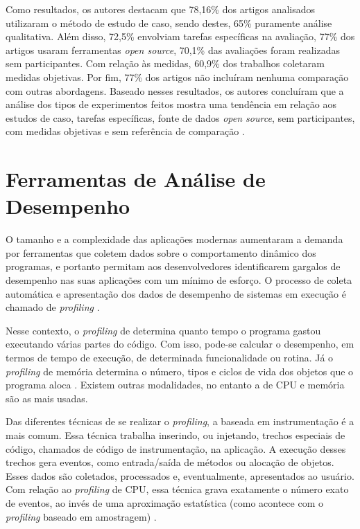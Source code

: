 Como resultados, os autores destacam que 78,16\% dos artigos analisados utilizaram o método de estudo de caso, sendo destes, 65\% puramente análise qualitativa. Além disso, 72,5\% envolviam tarefas específicas na avaliação, 77\% dos artigos usaram ferramentas \textit{open source}, 70,1\% das avaliações foram realizadas sem participantes. Com relação às medidas, 60,9\% dos trabalhos coletaram medidas objetivas. Por fim, 77\% dos artigos não incluíram nenhuma comparação com outras abordagens. Baseado nesses resultados, os autores concluíram que a análise dos tipos de experimentos feitos mostra uma tendência em relação aos estudos de caso, tarefas específicas, fonte de dados \textit{open source}, sem participantes, com medidas objetivas e sem referência de comparação \cite{Seriai2014}.

\section{Ferramentas de Análise de Desempenho} \label{sec:ferramentas-analise-desempenho}

O tamanho e a complexidade das aplicações modernas aumentaram a demanda por ferramentas que coletem dados sobre o comportamento dinâmico dos programas, e portanto permitam aos desenvolvedores identificarem gargalos de desempenho nas suas aplicações com um mínimo de esforço. O processo de coleta automática e apresentação dos dados de desempenho de sistemas em execução é chamado de \textit{profiling} \cite{Dmitriev2004}.

Nesse contexto, o \textit{profiling} de determina quanto tempo o programa gastou executando várias partes do código. Com isso, pode-se calcular o desempenho, em termos de tempo de execução, de determinada funcionalidade ou rotina. Já o \textit{profiling} de memória determina o número, tipos e ciclos de vida dos objetos que o programa aloca \cite{Dmitriev2004}. Existem outras modalidades, no entanto a de CPU e memória são as mais usadas.

Das diferentes técnicas de se realizar o \textit{profiling}, a baseada em instrumentação é a mais comum. Essa técnica trabalha inserindo, ou injetando, trechos especiais de código, chamados de código de instrumentação, na aplicação. A execução desses trechos gera eventos, como entrada/saída de métodos ou alocação de objetos. Esses dados são coletados, processados e, eventualmente, apresentados ao usuário. Com relação ao \textit{profiling} de CPU, essa técnica grava exatamente o número exato de eventos, ao invés de uma aproximação estatística (como acontece com o \textit{profiling} baseado em amostragem) \cite{Dmitriev2004}.

